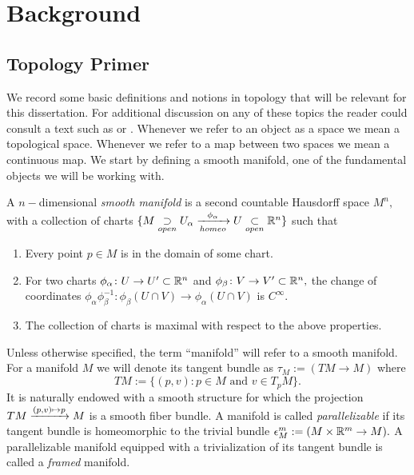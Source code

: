 \chapter{Background} \label{CH:B}


\section{Topology Primer}

We record some basic definitions and notions in topology that will be relevant for this dissertation. For additional discussion on any of these topics the reader could consult a text such as \cite{Hatch} or \cite{May}. Whenever we refer to an object as a space we mean a topological space. Whenever we refer to a map between two spaces we mean a continuous map. 
 We start by defining a smooth manifold, one of the fundamental objects we will be working with.

\begin{definition}
A $n-$dimensional \textit{smooth manifold} is a second countable Hausdorff space $M^{n},$ with a collection of charts $\{M \underset{open} \supset U_{\alpha} \xrightarrow[homeo]{\phi_{\alpha}} U \underset{open} \subset \mathbb R^{n} \}$ such that
\begin{enumerate}
\item Every point $p \in M$ is in the domain of some chart.
\item For two charts $\phi_{\alpha} \colon  U \rightarrow U' \subset \mathbb R^{n}$ and $\phi_{\beta} \colon V \rightarrow V' \subset \mathbb R^{n},$ the change of coordinates $\phi_{\alpha}\phi_{\beta}^{-1} \colon \phi_{\beta}(U \cap V) \rightarrow \phi_{\alpha}(U \cap V)$ is $C^{\infty}.$
\item The collection of charts is maximal with respect to the above properties. 
\end{enumerate}
\end{definition}


Unless otherwise specified, the term ``manifold'' will refer to a smooth manifold. For a manifold $M$ we will denote its tangent bundle as $\tau_{M} := (TM \longrightarrow M)$ where
\[
TM := \{(p, v) : p \in M \text{ and } v \in T_{p}M\}.
\] 
It is naturally endowed with a smooth structure for which the projection $TM \xrightarrow{(p, v) \mapsto p} M$ is a smooth fiber bundle.
A manifold is called \textit{parallelizable} if its tangent bundle is homeomorphic to the trivial bundle $\epsilon_{M}^{m}:= (M \times \mathbb R^{m} \rightarrow M).$ A parallelizable manifold equipped with a trivialization of its tangent bundle is called a \textit{framed} manifold. 

